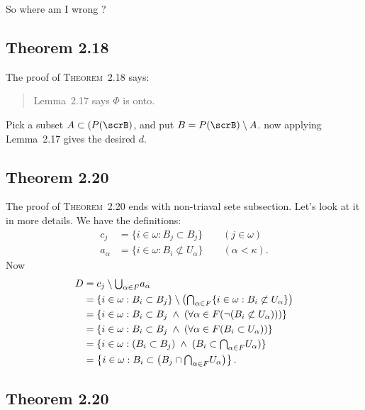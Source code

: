 So where am I wrong ?

\subsection{Theorem 2.18}

The proof of \textsc{Theorem}~2.18 says:
\begin{quote}
Lemma~2.17 says \(\Phi\) is onto.
\end{quote}
Pick a subset \(A\subset(P(\scrB)\), and put \(B=P(\scrB)\setminus A\).
now applying Lemma~2.17 gives the desired $d$.

\subsection{Theorem 2.20}

The proof of \textsc{Theorem}~2.20 ends
with non-triaval sete subsection.
Let's look at it in more details.
We have the definitions:
\begin{align*}
c_j &= \{i\in\omega: B_j \subset B_j\} \qquad(j\in\omega) \\
a_\alpha &= \{i\in\omega: B_i \not\subset U_\alpha\} \qquad(\alpha<\kappa).
\end{align*}
Now
\begin{align*}
D &= c_j \setminus \mathsmaller{\bigcup_{\alpha\in F}} a_\alpha \\
  &= \{i\in\omega: B_i \subset B_j\}
    \setminus
    \left(\mathsmaller{\bigcap_{\alpha\in F}} 
      \{i\in\omega: B_i \not\subset U_\alpha\}\right)  \\
  &= \{i\in\omega: B_i \subset B_j\;\land\;
       \left(\forall \alpha\in F (\lnot (B_i \not\subset U_\alpha))\right)\} \\
  &= \{i\in\omega: B_i \subset B_j\;\land\;
       \left(\forall \alpha\in F (B_i \subset U_\alpha)\right)\} \\
  &= \{i\in\omega: (B_i \subset B_j)\;\land\;
       (B_i \subset \mathsmaller{\bigcap_{\alpha\in F}} U_\alpha)\} \\
  &= \left\{i\in\omega: B_i \subset 
    \left(B_j\cap\mathsmaller{\bigcap_{\alpha\in F}} U_\alpha\right)\right\}.
\end{align*}

\subsection{Theorem 2.20}


